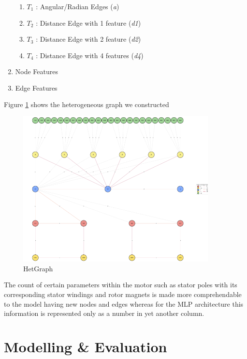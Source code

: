 \documentclass{report} %
\begin{document}
\begin{enumerate}
    \begin{enumerate}
        \item \( T_1\) : Angular/Radian Edges (\textit{a}) 
        \item \( T_2\) : Distance Edge with 1 feature (\textit{d1}) 
        \item \( T_3\) : Distance Edge with 2 feature (\textit{d2}) 
        \item \( T_4\) : Distance Edge with 4 features (\textit{d4})  
    \end{enumerate}
    \item Node Features 
    \item Edge Features 
\end{enumerate}

Figure \ref{fig:HetGraph} shows the heterogeneous graph we constructed
\begin{figure}[H]
    \centering
    \includegraphics[width=0.9\textwidth]{./ReportImages/graph.png} 
    \caption{HetGraph}
    \label{fig:HetGraph}
\end{figure}
The count of certain parameters within the motor such as stator poles with its corresponding stator windings and rotor magnets is made more comprehendable to the model having new nodes and edges whereas for the \ac{MLP} architecture this information is represented only as a number in yet another column. \\


\newpage 
\chapter{Modelling \& Evaluation}
\end{document}
